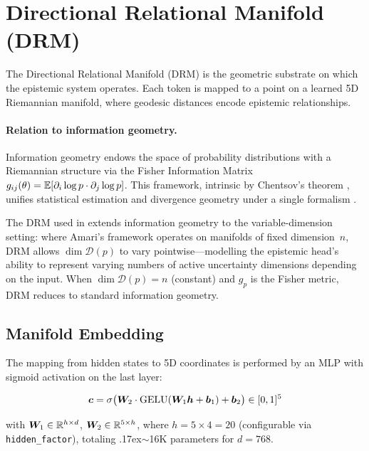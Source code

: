
\section{Directional Relational Manifold (DRM)}
\label{sec:drm}

The Directional Relational Manifold (DRM) is the geometric substrate
on which the epistemic system operates. Each token is mapped to a point
on a learned 5D Riemannian manifold, where geodesic distances encode
epistemic relationships.

\paragraph{Relation to information geometry.}
Information geometry \cite{Amari2000} endows the space of probability
distributions with a Riemannian structure via the Fisher Information Matrix
$g_{ij}(\theta) = \mathbb{E}[\partial_i \log p \cdot \partial_j \log p]$.
This framework, intrinsic by Chentsov's theorem \cite{Chentsov1982}, unifies
statistical estimation and divergence geometry under a single formalism
\cite{Nielsen2020}.

The DRM used in \aletheion{} extends information geometry to the
variable-dimension setting: where Amari's framework operates on manifolds of
fixed dimension~$n$, DRM allows $\dim\mathcal{D}(p)$ to vary
pointwise---modelling the epistemic head's ability to represent varying
numbers of active uncertainty dimensions depending on the input.  When
$\dim\mathcal{D}(p) = n$ (constant) and $g_p$ is the Fisher metric, DRM
reduces to standard information geometry.

\subsection{Manifold Embedding}

The mapping from hidden states to 5D coordinates is performed by an
MLP with sigmoid activation on the last layer:

\begin{equation}
    \bm{c} = \sigma\big(\bm{W}_2 \cdot \text{GELU}(\bm{W}_1 \bm{h} + \bm{b}_1) + \bm{b}_2\big) \in [0, 1]^5
    \label{eq:manifold_emb}
\end{equation}

with $\bm{W}_1 \in \mathbb{R}^{h \times d}$, $\bm{W}_2 \in \mathbb{R}^{5 \times h}$,
where $h = 5 \times 4 = 20$ (configurable via \texttt{hidden\_factor}),
totaling {\raise.17ex\hbox{$\scriptstyle\sim$}}16K parameters for $d = 768$.


